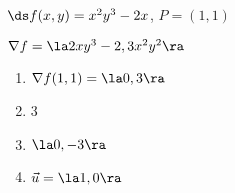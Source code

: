 {$\ds f(x,y) = x^2y^3-2x$, $P = (1,1)$
}
{$\nabla f = \la 2xy^3-2,3x^2y^2\ra$
\begin{enumerate}
	\item $\nabla f(1,1) = \la 0,3\ra$
	\item	3
	\item	$\la 0,-3\ra$
	\item	$\vec u = \la 1,0\ra$
\end{enumerate}
}